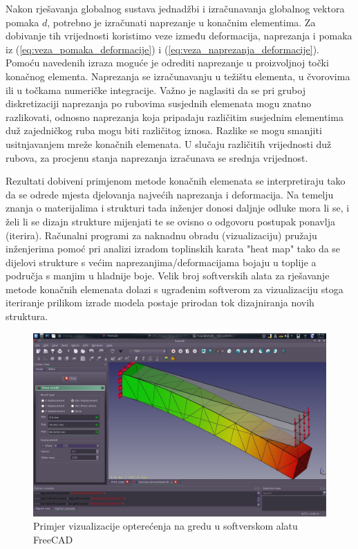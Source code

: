 \documentclass[a4paper,twoside,12pt]{memoir} %
\begin{document}
Nakon rješavanja globalnog sustava jednadžbi i izračunavanja globalnog vektora pomaka $d$, potrebno je izračunati naprezanje u konačnim elementima. Za dobivanje tih vrijednosti koristimo veze između deformacija, naprezanja i pomaka iz (\ref{eq:veza_pomaka_deformacije}) i (\ref{eq:veza_naprezanja_deformacije}). Pomoću navedenih izraza moguće je odrediti naprezanje u proizvoljnoj točki konačnog elementa. Naprezanja se izračunavanju u težištu elementa, u čvorovima ili u točkama numeričke integracije. Važno je naglasiti da se pri gruboj diskretizaciji naprezanja po rubovima susjednih elemenata mogu znatno razlikovati, odnosno naprezanja koja pripadaju različitim susjednim elementima duž zajedničkog ruba mogu biti različitog iznosa. Razlike se mogu smanjiti usitnjavanjem mreže konačnih elemenata. U slučaju različitih vrijednosti duž rubova, za procjenu stanja naprezanja izračunava se srednja vrijednost. \par

Rezultati dobiveni primjenom metode konačnih elemenata se interpretiraju tako da se odrede mjesta djelovanja najvećih naprezanja i deformacija. Na temelju znanja o materijalima i strukturi tada inženjer donosi daljnje odluke mora li se, i želi li se dizajn strukture mijenjati te se ovisno o odgovoru postupak ponavlja (iterira). Računalni programi za naknadnu obradu (vizualizaciju) pružaju inženjerima pomoć pri analizi izradom toplinskih karata "heat map" tako da se dijelovi strukture s većim naprezanjima/deformacijama bojaju u toplije a područja s manjim u hladnije boje. Velik broj softverskih alata za rješavanje metode konačnih elemenata dolazi s ugrađenim softverom za vizualizaciju stoga iteriranje prilikom izrade modela postaje prirodan tok dizajniranja novih struktura.

\begin{figure}[h!t]
\begin{center}
\includegraphics[scale=0.35]{pictures/chapter_fem/FEM_visualization_1.jpg}
\caption{Primjer vizualizacije opterećenja na gredu u softverskom alatu FreeCAD \cite{freefem_wiki_beam}}
\label{fig:freecad_beam}
\end{center}
\end{figure}
\end{document}
